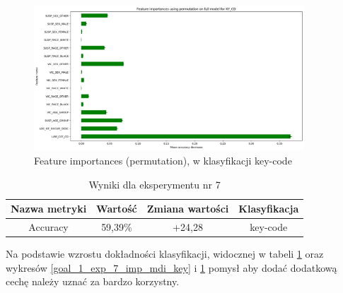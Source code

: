 \documentclass{classrep}
\begin{document}
{{{{                    \begin{figure}[!htbp]
                        \centering
                        \includegraphics[width=0.9\textwidth]{img/5.1.3/7/Feature importances using permutation on full model for KY_CD.png}
                        \caption{Feature importances (permutation), w klasyfikacji key-code}
                        \label{goal_1_exp_7_imp_perm_key}
                    \end{figure}
                    
                    \begin{table}
                    \centering
                     \begin{tabular}{|c|c|c|c|}
                            \hline
                          Nazwa metryki & Wartość & Zmiana wartości & Klasyfikacja \\ \hline
                            Accuracy &  59,39\% & +24,28 & key-code\\ \hline
                        \end{tabular}
                        \caption{Wyniki dla eksperymentu nr 7}
                        \label{goal_1_exp_7_results}
                     \end{table}
                     \FloatBarrier
                    Na podstawie wzrostu dokładności klasyfikacji, widocznej w tabeli
                    \ref{goal_1_exp_7_results} oraz wykresów
                    \ref{goal_1_exp_7_imp_mdi_key} i \ref{goal_1_exp_7_imp_perm_key}
                    pomysł aby dodać dodatkową cechę należy uznać za bardzo korzystny.
                }

}}}
\end{document}
